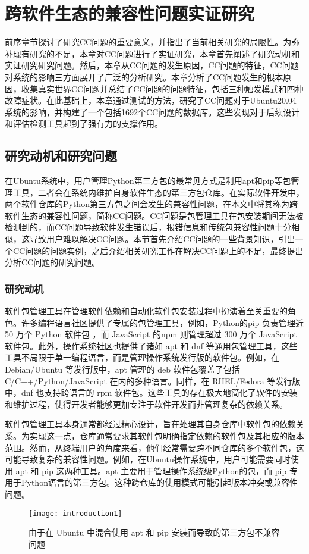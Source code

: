 \chapter{跨软件生态的兼容性问题实证研究}
前序章节探讨了研究CC问题的重要意义，并指出了当前相关研究的局限性。为弥补现有研究的不足，本章对CC问题进行了实证研究，本章首先阐述了研究动机和实证研究研究问题。然后，本章从CC问题的发生原因，CC问题的特征，CC问题对系统的影响三方面展开了广泛的分析研究。本章分析了CC问题发生的根本原因，收集真实世界CC问题并总结了CC问题的问题特征，包括三种触发模式和四种故障症状。在此基础上，本章通过测试的方法，研究了CC问题对于Ubuntu20.04系统的影响，并构建了一个包括1692个CC问题的数据库。这些发现对于后续设计和评估检测工具起到了强有力的支撑作用。

\section{研究动机和研究问题}
在Ubuntu系统中，用户管理Python第三方包的最常见方式是利用apt和pip等包管理工具，二者会在系统内维护自身软件生态的第三方包仓库。在实际软件开发中，两个软件仓库的Python第三方包之间会发生的兼容性问题，在本文中将其称为跨软件生态的兼容性问题，简称CC问题。CC问题是包管理工具在包安装期间无法被检测到的，而CC问题导致软件发生错误后，报错信息和传统包兼容性问题十分相似，这导致用户难以解决CC问题。本节首先介绍CC问题的一些背景知识，引出一个CC问题的问题实例，之后介绍相关研究工作在解决CC问题上的不足，最终提出分析CC问题的研究问题。
\subsection{研究动机}\label{3.1.1}
软件包管理工具在管理软件依赖和自动化软件包安装过程中扮演着至关重要的角色。许多编程语言社区提供了专属的包管理工具，例如，Python的pip 负责管理近 50 万个 Python 软件包 ，而 JavaScript 的npm 则管理超过 300 万个 JavaScript 软件包。此外，操作系统社区也提供了诸如 apt 和 dnf 等通用包管理工具，这些工具不局限于单一编程语言，而是管理操作系统发行版的软件包。例如，在 Debian/Ubuntu 等发行版中，apt 管理的 deb 软件包覆盖了包括 C/C++/Python/JavaScript 在内的多种语言。同样，在 RHEL/Fedora 等发行版中，dnf 也支持跨语言的 rpm 软件包。这些工具的存在极大地简化了软件的安装和维护过程，使得开发者能够更加专注于软件开发而非管理复杂的依赖关系。

软件包管理工具本身通常都经过精心设计，旨在处理其自身仓库中软件包的依赖关系。为实现这一点，仓库通常要求其软件包明确指定依赖的软件包及其相应的版本范围。然而，从终端用户的角度来看，他们经常需要跨不同仓库的多个软件包，这可能导致复杂的兼容性问题。例如，在Ubuntu操作系统中，用户可能需要同时使用 apt 和 pip 这两种工具。apt 主要用于管理操作系统级Python的包，而 pip 专用于Python语言的第三方包。这种跨仓库的使用模式可能引起版本冲突或兼容性问题。
\begin{figure}[t] %
	\centering
	\texttt{[image: introduction1]}
	\caption{由于在 Ubuntu 中混合使用 apt 和 pip 安装而导致的第三方包不兼容问题}
	\label{fig:example}
\end{figure}

